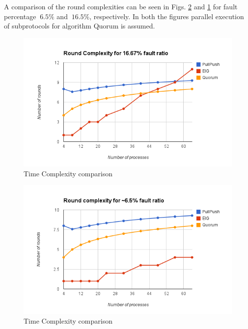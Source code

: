A comparison of the round complexities can be seen in Figs. \ref{fig:round6} and \ref{fig:round16} for fault percentage $~6.5\%$ and $~16.5\%$, respectively. In both the figures parallel execution of subprotocols for algorithm Quorum is assumed. 

\begin{figure}[h]
 \centering
\includegraphics[scale=0.4]{Round16}
\caption{Time Complexity comparison}
 \label{fig:round16}
\end{figure}

\begin{figure}[h]
 \centering
\includegraphics[scale=0.4]{Round6}
\caption{Time Complexity comparison}
 \label{fig:round6}
\end{figure}

